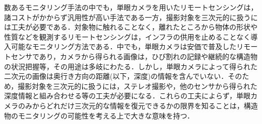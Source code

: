 \begin{comment}
動きのあるインフラ構造物のモニタリングにおいて，単眼カメラを用いたリモートセンシングは，人的・金銭的コストの小さい方法として有力である．
インフラ構造物のモニタリングデータの取得方法として，人の手作業による定期的な点検以外に，各種センサを用いた継続的なデータの取得が考えられる．
その中でも，対象物に触れることなく，離れたところから物体の形状や性質などを観測するリモートセンシングは，インフラを止めることなく導入可能なモニタリング方法の一つである．
単眼カメラは，ステレオカメラやLiDARといった他のリモートセンサと比べて，安価で普及している．
また，カメラは時間解像度，空間解像度が高い．
そのため，小さく速い動きのあるインフラ構造物に対してもその動きを正確にとらえることが可能である．
さらに，メンテナンスがしやすく，カメラの同期といった高度な処理も必要としないため，多くの人が簡単に利用可能である．
\end{comment}
数あるモニタリング手法の中でも，単眼カメラを用いたリモートセンシングは，諸コストがかからず汎用性が高い手法である一方，撮影対象を三次元的に扱うには工夫が必要である．対象物に触れることなく，離れたところから物体の形状や性質などを観測するリモートセンシングは，インフラの供用を止めることなく導入可能なモニタリング方法である．中でも，単眼カメラは安価で普及したリモートセンサであり，カメラから得られる画像は，ひび割れの記録や継続的な構造物の状況把握等，その用途は多岐にわたる．しかし，単眼カメラによって得られた二次元の画像は奥行き方向の距離(以下，深度)の情報を含んでいない．そのため，撮影対象を三次元的に扱うには，ステレオ撮影や，他のセンサから得られた深度情報と組み合わせる等の工夫が必要になる．これらの工夫によらず，単眼カメラのみからどれだけ三次元的な情報を復元できるかの限界を知ることは，構造物のモニタリングの可能性を考える上で大きな意味を持つ．

\begin{comment}
カメラの連続画像から静止している撮影対象物の三次元形状を逐次的に推定することは，「逐次的自己位置推定及び環境地図作成」（Simultaneous Localization and Mapping．以下，SLAM）というタスクにより達成できる．
これはセンサによって逐次的に周辺環境の地図を作成しながら，センサ自身の位置（自己位置）を推定する技術のことであり，自律移動するあらゆる機械の制御に欠かすことができない\cite{tomono正裕2018slam}．
SLAMは自動運転やドローンの自律飛行を目的として，近年活発に研究されている．
SLAMの中でも，カメラをセンサに用いる場合には特にVisual SLAMと呼ぶ．
これはその処理工程の中に，Structure from Motion（以下，SfM）と呼ばれる技術を含んでいる．
SfMはある対象を複数の視点から撮影した画像から，画像間の特徴点を対応づけることで三次元再構成と各視点姿勢を同時推定する技術である\cite{中村恭之2017-08-05}．
\end{comment}

